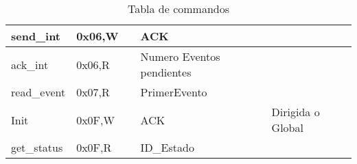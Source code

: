 \begin{table}[h]
{\begin{tabular}{|l|l|l|l|l|}
    send\_int        & 0x06,W  &                 & ACK                       &                                                                                         \\ \hline
    ack\_int         & 0x06,R  &                 & Numero Eventos pendientes &                                                                                         \\ \hline
    read\_event      & 0x07,R  &                 & PrimerEvento              &                                                                                         \\ \hline
    Init             & 0x0F,W  &                 & ACK                       & Dirigida o Global                                                                       \\ \hline
    get\_status      & 0x0F,R  &                 & ID\_Estado                &                                                                                         \\ \hline
    \end{tabular}
    }
    \caption{Tabla de commandos}
    \label{tab:Commands}
\end{table}

